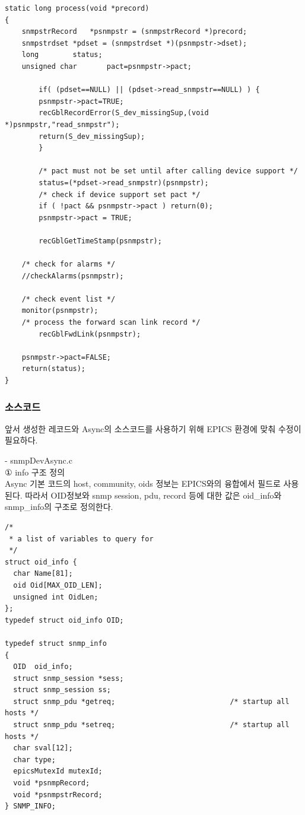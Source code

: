 \documentclass[11pt
  , a4paper
  , article
  , oneside
]{memoir}
\begin{document}
{\scriptsize
\begin{lstlisting}[style=termstyle]
static long process(void *precord)
{
	snmpstrRecord	*psnmpstr = (snmpstrRecord *)precord;
	snmpstrdset	*pdset = (snmpstrdset *)(psnmpstr->dset);
	long		status;
	unsigned char       pact=psnmpstr->pact;

        if( (pdset==NULL) || (pdset->read_snmpstr==NULL) ) {
        psnmpstr->pact=TRUE;
        recGblRecordError(S_dev_missingSup,(void *)psnmpstr,"read_snmpstr");
        return(S_dev_missingSup);
        }

        /* pact must not be set until after calling device support */
        status=(*pdset->read_snmpstr)(psnmpstr);
        /* check if device support set pact */
        if ( !pact && psnmpstr->pact ) return(0);
        psnmpstr->pact = TRUE;

        recGblGetTimeStamp(psnmpstr);

	/* check for alarms */
	//checkAlarms(psnmpstr);

	/* check event list */
	monitor(psnmpstr);
	/* process the forward scan link record */
        recGblFwdLink(psnmpstr);

	psnmpstr->pact=FALSE;
	return(status);
}
\end{lstlisting}
}

\hfill

\subsubsection{소스코드}
앞서 생성한 레코드와 Async의 소스코드를 사용하기 위해 EPICS 환경에 맞춰 수정이 필요하다.


\hfill

- snmpDevAsync.c\\
① info 구조 정의\\
Async 기본 코드의 host, community, oids 정보는 EPICS와의 융합에서 필드로 사용된다. 따라서 OID정보와 snmp session, pdu, record 등에 대한 값은 oid\_info와 snmp\_info의 구조로 정의한다.

{\scriptsize
\begin{lstlisting}[style=termstyle]
/*
 * a list of variables to query for
 */
struct oid_info {
  char Name[81];
  oid Oid[MAX_OID_LEN];
  unsigned int OidLen;
};
typedef struct oid_info OID;

typedef struct snmp_info
{
  OID  oid_info;
  struct snmp_session *sess;
  struct snmp_session ss;
  struct snmp_pdu *getreq;                           /* startup all hosts */
  struct snmp_pdu *setreq;                           /* startup all hosts */
  char sval[12];
  char type;
  epicsMutexId mutexId;
  void *psnmpRecord;
  void *psnmpstrRecord;
} SNMP_INFO;
\end{lstlisting}
}
\end{document}
